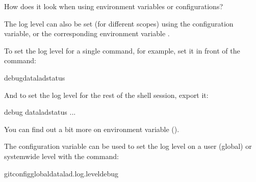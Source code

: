 \ignorespaces \begin{findoutmore}[label={index-3}, before title={\thetcbcounter\ }, check odd page=true]{How does it look when using environment variables or configurations?}
\label{\detokenize{basics/101-135-help:index-3}}

\sphinxAtStartPar
The log level can also be set (for different scopes) using the  configuration variable, or the corresponding environment variable .

\sphinxAtStartPar
To set the log level for a single command, for example, set it in front of the command:

\begin{sphinxVerbatim}[commandchars=\\\{\}]
debugdataladstatus
\end{sphinxVerbatim}

\sphinxAtStartPar
And to set the log level for the rest of the shell session, export it:

\begin{sphinxVerbatim}[commandchars=\\\{\}]
debug
dataladstatus
...
\end{sphinxVerbatim}

\sphinxAtStartPar
You can find out a bit more on environment variable {\hyperref[\detokenize{basics/101-123-config2:fom-envvar}]{}} ().

\sphinxAtStartPar
The configuration variable can be used to set the log level on a user (global) or system\sphinxhyphen{}wide level with the  command:

\begin{sphinxVerbatim}[commandchars=\\\{\}]
gitconfig\PYGZhy{}\PYGZhy{}globaldatalad.log.leveldebug
\end{sphinxVerbatim}


\end{findoutmore}

